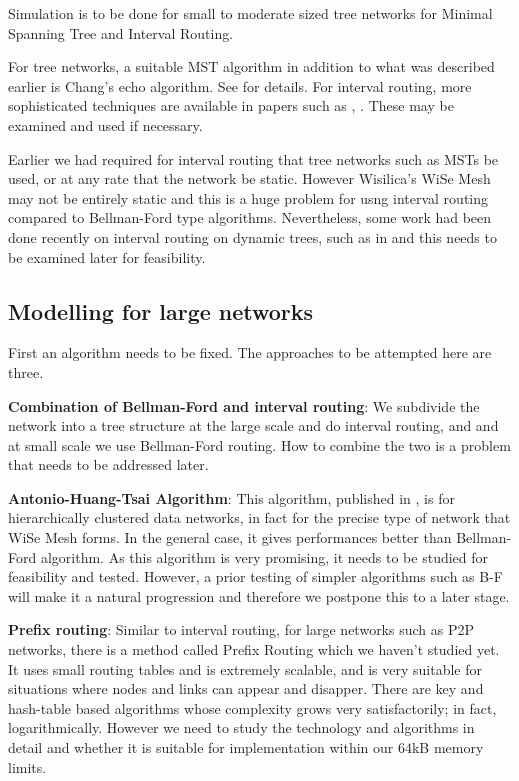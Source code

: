 \documentclass[fleqn,a4paper]{SelfArx}
\begin{document}
Simulation is to be done for small to moderate sized tree networks for Minimal Spanning Tree and Interval Routing. 

For tree networks, a suitable MST algorithm in addition to what was described earlier is Chang's echo algorithm. See \cite{Chang:1982Echo} for
details. For interval routing, more sophisticated techniques are available in papers such as \cite{Leeuwen:1985Tan}, \cite{Fraigniaud:1998Gavoille}. 
These may be examined and used if necessary.

Earlier we had required for interval routing that tree networks such as MSTs be used, or at any rate that the network be static. However
Wisilica's WiSe Mesh may not be entirely static and this is a huge problem for usng interval routing compared to Bellman-Ford type algorithms.
Nevertheless, some work had been done recently on interval routing on dynamic trees, such as in \cite{Korman:2009} and this needs
to be examined later for feasibility.

\subsection{Modelling for large networks}

First an algorithm needs to be fixed. The approaches to be attempted here are three.

\textbf{Combination of Bellman-Ford and interval routing}: We subdivide the network into a tree structure at the large scale and do
interval routing, and and at small scale we use Bellman-Ford routing. How to combine the two is a problem that needs to be addressed
later.

\textbf{Antonio-Huang-Tsai Algorithm}: This algorithm, published in \cite{Antonio:1992HuangTsai}, is for hierarchically clustered
data networks, in fact for the precise type of network that WiSe Mesh forms. In the general case, it gives performances better 
than Bellman-Ford algorithm. As this algorithm is very promising, it needs to be studied for feasibility and tested. However, a 
prior testing of simpler algorithms such as B-F will make it a natural progression and therefore we postpone this to a later stage.

\textbf{Prefix routing}: Similar to interval routing, for large networks such as P2P networks, there is a method called Prefix Routing which we haven't studied yet. It uses small routing tables and is
extremely scalable, and is very suitable for situations where nodes and links can appear and disapper. There are key and hash-table
based algorithms whose complexity grows very satisfactorily; in fact, logarithmically. However we need to study the technology and 
algorithms in detail and whether it is suitable for implementation within our $64$kB memory limits.
\end{document}
